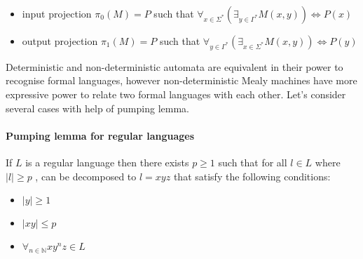\documentclass[12pt]{article}
\begin{document}
\begin{itemize}
	\item input projection $\pi_0(M) = P$ such that $\forall_{x\in\Sigma^*} (\exists_{y\in\Gamma^*}M(x,y) ) \iff P(x) $
	\item output projection  $\pi_1(M) = P$ such that $\forall_{y\in\Gamma^*} (\exists_{x\in\Sigma^*}M(x,y) ) \iff P(y) $
\end{itemize} 
Deterministic and non-deterministic automata are equivalent in their power to recognise formal languages, however non-deterministic Mealy machines have more expressive power to relate two formal languages with each other. Let's consider several cases with help of pumping lemma. 

\paragraph{Pumping lemma for regular languages}
If $L$ is a regular language then there exists $p\ge1$  such that for all $l \in L$ where $\vert l \vert \ge p$ , can be decomposed to $l = xyz$ that satisfy the following conditions:
\begin{itemize}
	\item $\vert y \vert \ge 1$ 
	\item $\vert xy \vert \le p$ 
	\item $\forall_{n\in \mathbb{N}}  xy^nz \in L$ 
\end{itemize}
\end{document}
